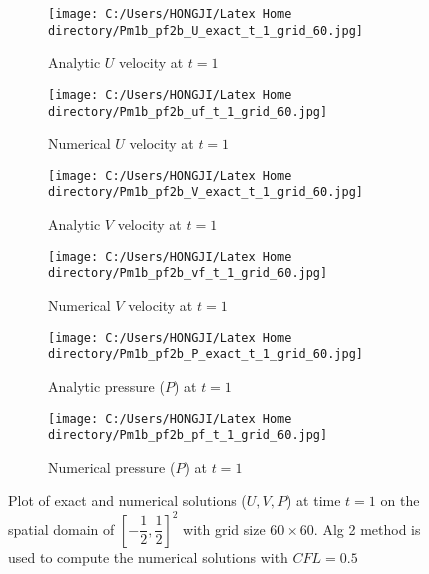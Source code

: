 \begin{figure}[H]
	\centering
	\begin{subfigure}[t]{2.5in}
		\centering
		\texttt{[image: C:/Users/HONGJI/Latex Home directory/Pm1b\_pf2b\_U\_exact\_t\_1\_grid\_60.jpg]}
		\caption{Analytic $U$ velocity at $t=1$}\label{fig:6.7a}		
	\end{subfigure}
	\quad
	\begin{subfigure}[t]{2.5in}
		\centering
		\texttt{[image: C:/Users/HONGJI/Latex Home directory/Pm1b\_pf2b\_uf\_t\_1\_grid\_60.jpg]}
		\caption{Numerical $U$ velocity at $t=1$}\label{fig:6.7b}
	\end{subfigure}
	\quad
	\begin{subfigure}[t]{2.5in}
		\centering
		\texttt{[image: C:/Users/HONGJI/Latex Home directory/Pm1b\_pf2b\_V\_exact\_t\_1\_grid\_60.jpg]}
		\caption{Analytic $V$ velocity at $t=1$}\label{fig:6.7c}
	\end{subfigure}
	\quad
	\begin{subfigure}[t]{2.5in}
		\centering
		\texttt{[image: C:/Users/HONGJI/Latex Home directory/Pm1b\_pf2b\_vf\_t\_1\_grid\_60.jpg]}
		\caption{Numerical $V$ velocity at $t=1$}\label{fig:6.7d}
	\end{subfigure}
	\quad	
	\begin{subfigure}[t]{2.5in}
		\centering
		\texttt{[image: C:/Users/HONGJI/Latex Home directory/Pm1b\_pf2b\_P\_exact\_t\_1\_grid\_60.jpg]}
		\caption{Analytic pressure ($P$) at $t=1$}\label{fig:6.7e}
	\end{subfigure}
	\quad	
	\begin{subfigure}[t]{2.5in}
		\centering
		\texttt{[image: C:/Users/HONGJI/Latex Home directory/Pm1b\_pf2b\_pf\_t\_1\_grid\_60.jpg]}
		\caption{Numerical pressure ($P$) at $t=1$}\label{fig:6.7f}
	\end{subfigure}
	\caption{Plot of exact and numerical solutions ($U,V,P$) at time $t=1$ on the spatial domain of $[-\dfrac{1}{2},\dfrac{1}{2}]^2$ with grid size $60 \times 60$. Alg 2 method is used to compute the numerical solutions with $CFL=0.5$}\label{fig:6.7}
\end{figure}

